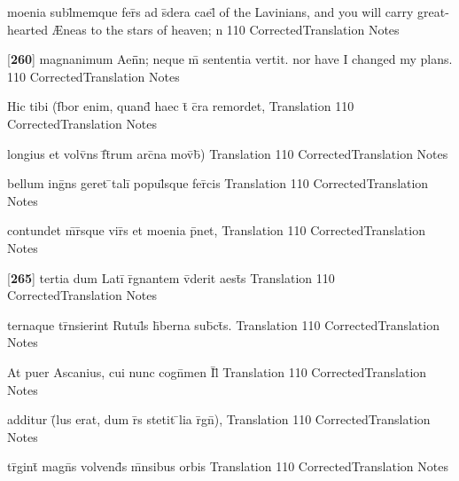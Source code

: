 \documentclass[]{book}
\begin{document}
\latline
  {moenia subl\={\macron {\i}}memque fer\={}s ad s\={\macron {\i}}dera cael\={\macron {\i}}}
  { of the Lavinians, and you will carry great-hearted {\AE}neas to the stars of heaven; n }
  {110}
  { CorrectedTranslation }
  { Notes }


\latline
  {[\textbf{260}] magnanimum Aen\={}\={}n; neque m\={} sententia vertit.}
  { nor have I changed my plans. }
  {110}
  { CorrectedTranslation }
  { Notes }


\latline
  {Hic tibi (f\={}bor enim, quand\={} haec t\={} c\={}ra remordet,}
  { Translation }
  {110}
  { CorrectedTranslation }
  { Notes }


\latline
  {longius et volv\={}ns f\={}t\={}rum arc\={}na mov\={}b\={})}
  { Translation }
  {110}
  { CorrectedTranslation }
  { Notes }


\latline
  {bellum ing\={}ns geret \={}tali\={} popul\={}sque fer\={}cis}
  { Translation }
  {110}
  { CorrectedTranslation }
  { Notes }


\latline
  {contundet m\={}r\={}sque vir\={\macron {\i}}s et moenia p\={}net,}
  { Translation }
  {110}
  { CorrectedTranslation }
  { Notes }


\latline
  {[\textbf{265}] tertia dum Lati\={} r\={}gnantem v\={\macron {\i}}derit aest\={}s}
  { Translation }
  {110}
  { CorrectedTranslation }
  { Notes }


\latline
  {ternaque tr\={}nsierint Rutul\={\macron {\i}}s h\={\macron {\i}}berna sub\={}ct\={\macron {\i}}s.}
  { Translation }
  {110}
  { CorrectedTranslation }
  { Notes }


\latline
  {At puer Ascanius, cui nunc cogn\={}men I\={}l\={}}
  { Translation }
  {110}
  { CorrectedTranslation }
  { Notes }


\latline
  {additur (\={}lus erat, dum r\={}s stetit \={}lia r\={}gn\={}),}
  { Translation }
  {110}
  { CorrectedTranslation }
  { Notes }


\latline
  {tr\={\macron {\i}}gint\={} magn\={}s volvend\={\macron {\i}}s m\={}nsibus orbis}
  { Translation }
  {110}
  { CorrectedTranslation }
  { Notes }
\end{document}
